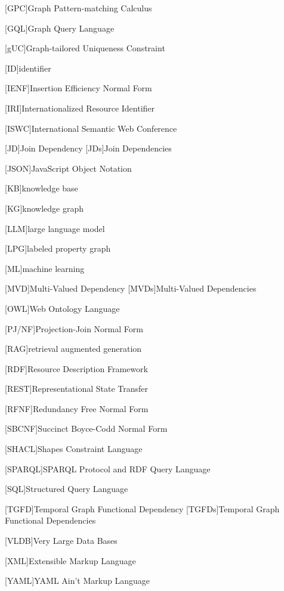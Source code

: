 \begin{acronym}
[GPC]{Graph Pattern-matching Calculus}

[GQL]{Graph Query Language}

[gUC]{Graph-tailored Uniqueness Constraint}

[ID]{identifier}

[IENF]{Insertion Efficiency Normal Form}

[IRI]{Internationalized Resource Identifier}

[ISWC]{International Semantic Web Conference}

[JD]{Join Dependency}
[JDs]{Join Dependencies}

[JSON]{JavaScript Object Notation}

[KB]{knowledge base}

[KG]{knowledge graph}

[LLM]{large language model}

[LPG]{labeled property graph}

[ML]{machine learning}

[MVD]{Multi-Valued Dependency}
[MVDs]{Multi-Valued Dependencies}

[OWL]{Web Ontology Language}

[PJ/NF]{Projection-Join Normal Form}

[RAG]{retrieval augmented generation}

[RDF]{Resource Description Framework}

[REST]{Representational State Transfer}

[RFNF]{Redundancy Free Normal Form}

[SBCNF]{Succinct Boyce-Codd Normal Form} %

[SHACL]{Shapes Constraint Language}

[SPARQL]{SPARQL Protocol and RDF Query Language}

[SQL]{Structured Query Language}

[TGFD]{Temporal Graph Functional Dependency}
[TGFDs]{Temporal Graph Functional Dependencies}

[VLDB]{Very Large Data Bases}

[XML]{Extensible Markup Language}

[YAML]{YAML Ain't Markup Language}

\end{acronym}
